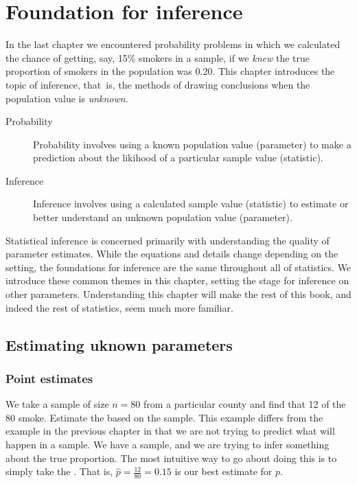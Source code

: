 \chapter{Foundation for inference}
\label{FoundationForInference}

In the last chapter we encountered probability problems in which we calculated the chance of getting, say, 15\% smokers in a sample, if we \emph{knew} the true proportion of smokers in the population was 0.20.  This chapter introduces the topic of inference, that~is, the methods of drawing conclusions when the population value is \emph{unknown}.  

\begin{termBox}{
\begin{description}
\item[Probability] Probability involves using a known population value (parameter) to make a prediction about the likihood of a particular sample value (statistic).
\item[Inference] Inference involves using a calculated sample value (statistic) to estimate or better understand an unknown population value (parameter).
\end{description}
}
\end{termBox}

Statistical inference is concerned primarily with understanding the quality of parameter estimates. While the equations and details change depending on the setting, the foundations for inference are the same throughout all of statistics. We introduce these common themes in this chapter, setting the stage for inference on other parameters.  Understanding this chapter will make the rest of this book, and indeed the rest of statistics, seem much more familiar.

\section{Estimating uknown parameters}
\subsection{Point estimates}
\label{pointEstimates}


\begin{example}{We take a sample of size $n=80$ from a particular county and find that 12 of the 80 smoke.  Estimate the  based on the sample. This example differs from the example in the previous chapter in that we are not trying to predict what will happen in a sample.  We have a sample, and we are trying to infer something about the true proportion.  }The most intuitive way to go about doing this is to simply take the . That is,
$\hat{p} = \frac{12}{80} = 0.15$ is our best estimate for $p$.
\end{example}

